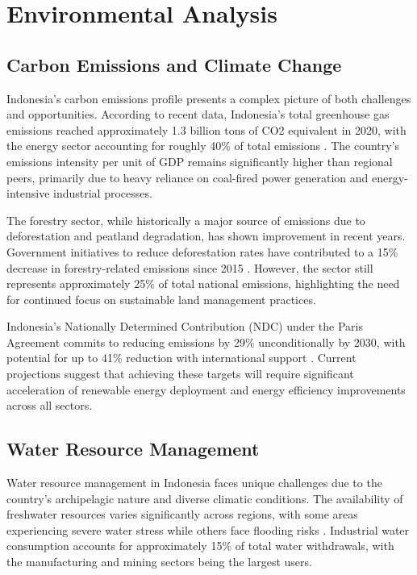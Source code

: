 \section{Environmental Analysis}

\subsection{Carbon Emissions and Climate Change}

Indonesia's carbon emissions profile presents a complex picture of both challenges and opportunities. According to recent data, Indonesia's total greenhouse gas emissions reached approximately 1.3 billion tons of CO2 equivalent in 2020, with the energy sector accounting for roughly 40\% of total emissions \cite{ref_id1}. The country's emissions intensity per unit of GDP remains significantly higher than regional peers, primarily due to heavy reliance on coal-fired power generation and energy-intensive industrial processes.

The forestry sector, while historically a major source of emissions due to deforestation and peatland degradation, has shown improvement in recent years. Government initiatives to reduce deforestation rates have contributed to a 15\% decrease in forestry-related emissions since 2015 \cite{ref_id2}. However, the sector still represents approximately 25\% of total national emissions, highlighting the need for continued focus on sustainable land management practices.

Indonesia's Nationally Determined Contribution (NDC) under the Paris Agreement commits to reducing emissions by 29\% unconditionally by 2030, with potential for up to 41\% reduction with international support \cite{ref_id3}. Current projections suggest that achieving these targets will require significant acceleration of renewable energy deployment and energy efficiency improvements across all sectors.

\subsection{Water Resource Management}

Water resource management in Indonesia faces unique challenges due to the country's archipelagic nature and diverse climatic conditions. The availability of freshwater resources varies significantly across regions, with some areas experiencing severe water stress while others face flooding risks \cite{ref_id4}. Industrial water consumption accounts for approximately 15\% of total water withdrawals, with the manufacturing and mining sectors being the largest users.

